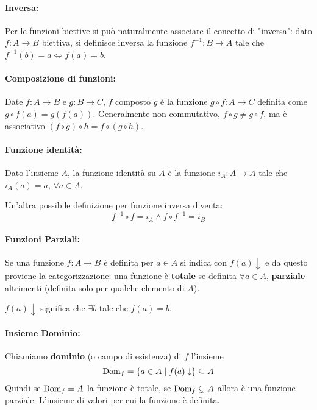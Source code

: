 \paragraph{Inversa:} Per le funzioni biettive si può naturalmente associare il concetto di "inversa": dato $f: A \rightarrow B$ biettiva, si definisce inversa la funzione $f^{-1}: B \rightarrow A$ tale che $f^{-1} (b) = a \Leftrightarrow f(a) = b$.

\paragraph{Composizione di funzioni:} Date $f: A \rightarrow B$ e $g: B \rightarrow C$, $f$ composto $g$ è la funzione $g \circ f: A \rightarrow C$ definita come $g \circ f(a) = g(f(a))$. Generalmente non commutativo, $f \circ g \neq g \circ f$, ma è associativo $(f \circ g) \circ h = f \circ (g \circ h)$.

\paragraph{Funzione identità:} Dato l'insieme $A$, la funzione identità su $A$ è la funzione $i_A: A \rightarrow A$ tale che $i_A (a) = a$, $\forall a \in A$.

Un'altra possibile definizione per funzione inversa diventa:
$$ f^{-1} \circ f = i_A \wedge f \circ f^{-1} = i_B $$

\paragraph{Funzioni Parziali:} Se una funzione $f: A \rightarrow B$ è definita per $a \in A$ si indica con $f(a) \downarrow$ e da questo proviene la categorizzazione: una funzione è \textbf{totale} se definita $\forall a \in A$, \textbf{parziale} altrimenti (definita solo per qualche elemento di $A$).

$f(a) \downarrow$ significa che $\exists b$ tale che $f(a) = b$.

\paragraph{Insieme Dominio:} Chiamiamo \textbf{dominio} (o campo di esistenza) di $f$ l'insieme
$$ \text{Dom}_f = \left\{a \in A \mid f(a) \downarrow \right\} \subseteq A $$
Quindi se $\text{Dom}_f = A$ la funzione è totale, se $\text{Dom}_f \subsetneq A$ allora è una funzione parziale. L'insieme di valori per cui la funzione è definita.

